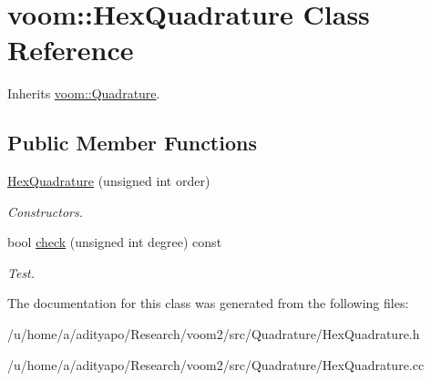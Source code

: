 \hypertarget{classvoom_1_1_hex_quadrature}{
\section{voom::HexQuadrature Class Reference}
\label{classvoom_1_1_hex_quadrature}
}


Inherits \hyperlink{classvoom_1_1_quadrature}{voom::Quadrature}.\subsection*{Public Member Functions}
\begin{DoxyCompactItemize}
\item 
\hypertarget{classvoom_1_1_hex_quadrature_a0585fe7f1af2186daff6bbde8aa6df69}{
\hyperlink{classvoom_1_1_hex_quadrature_a0585fe7f1af2186daff6bbde8aa6df69}{HexQuadrature} (unsigned int order)}
\label{classvoom_1_1_hex_quadrature_a0585fe7f1af2186daff6bbde8aa6df69}

\begin{DoxyCompactList}\small\item\em Constructors. \item\end{DoxyCompactList}\item 
\hypertarget{classvoom_1_1_hex_quadrature_a981bb4b1fa414c34bab3adf12734687a}{
bool \hyperlink{classvoom_1_1_hex_quadrature_a981bb4b1fa414c34bab3adf12734687a}{check} (unsigned int degree) const }
\label{classvoom_1_1_hex_quadrature_a981bb4b1fa414c34bab3adf12734687a}

\begin{DoxyCompactList}\small\item\em Test. \item\end{DoxyCompactList}\end{DoxyCompactItemize}


The documentation for this class was generated from the following files:\begin{DoxyCompactItemize}
\item 
/u/home/a/adityapo/Research/voom2/src/Quadrature/HexQuadrature.h\item 
/u/home/a/adityapo/Research/voom2/src/Quadrature/HexQuadrature.cc\end{DoxyCompactItemize}

